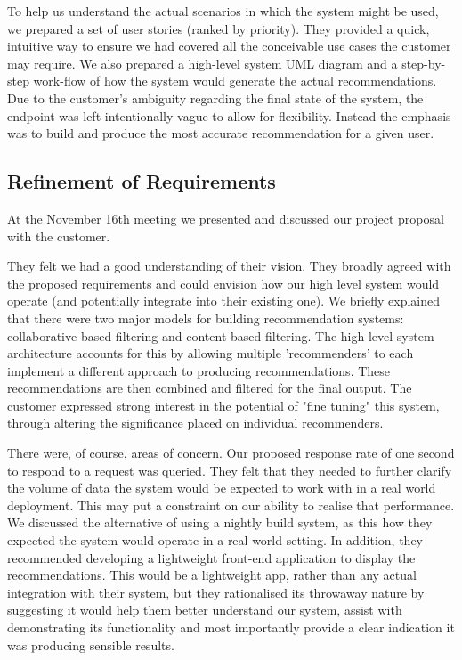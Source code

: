 \documentclass{l3proj}
\begin{document}
To help us understand the actual scenarios in which the system might be used, we prepared a set of user stories (ranked by priority). They provided a quick, intuitive way to ensure we had covered all the conceivable use cases the customer may require. We also prepared a high-level system UML diagram and a step-by-step work-flow of how the system would generate the actual recommendations. Due to the customer's ambiguity regarding the final state of the system, the endpoint was left intentionally vague to allow for flexibility. Instead the emphasis was to build and produce the most accurate recommendation for a given user. 


\subsection{Refinement of Requirements}
\label{sec:custrefineinitobj}


At the November 16th meeting we presented and discussed our project proposal with the customer.

They felt we had a good understanding of their vision. They broadly agreed with the proposed requirements and could envision how our high level system would operate (and potentially integrate into their existing one). We briefly explained that there were two major models for building recommendation systems: collaborative-based filtering and content-based filtering. The high level system architecture accounts for this by allowing multiple 'recommenders' to each implement a different approach to producing recommendations. These recommendations are then combined and filtered for the final output. The customer expressed strong interest in the potential of "fine tuning" this system, through altering the significance placed on individual recommenders. 

There were, of course, areas of concern. Our proposed response rate of one second to respond to a request was queried. They felt that they needed to further clarify the volume of data the system would be expected to work with in a real world deployment. This may put a constraint on our ability to realise that performance. We discussed the alternative of using a nightly build system, as this how they expected the system would operate in a real world setting. In addition, they recommended developing a lightweight front-end application to display the recommendations. This would be a lightweight app, rather than any actual integration with their system, but they rationalised its throwaway nature by suggesting it would help them better understand our system, assist with demonstrating its functionality and most importantly provide a clear indication it was producing sensible results. 
\end{document}
